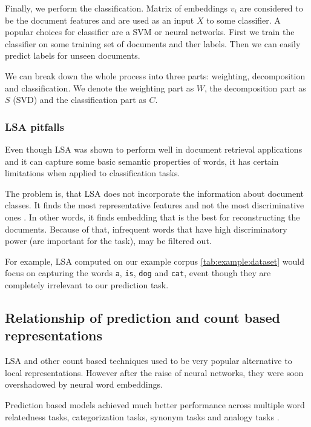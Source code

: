     Finally, we perform the classification.
    Matrix of embeddings $v_i$ are considered to be the document features and are used as an input $X$ to some classifier. 
    A popular choices for classifier are a SVM or neural networks.
    First we train the classifier on some training set of documents and ther labels.
    Then we can easily predict labels for unseen documents.
    
    We can break down the whole process into three parts: weighting, decomposition and classification.
    We denote the weighting part as $W$, the decomposition part as $S$ (SVD) and the classification part as $C$.
    
    \subsubsection{LSA pitfalls}

    Even though LSA was shown to perform well in document retrieval applications and it can capture some basic semantic properties of words,
    it has certain limitations when applied to classification tasks. 
    
    The problem is, that LSA does not incorporate the information about document classes. 
    It finds the most representative features and not the most discriminative ones \cite{berry1995using}.
    In other words, it finds embedding that is the best for reconstructing the documents.
    Because of that, infrequent words that have high discriminatory power (are important for the task), may be filtered out.
    
    For example, LSA computed on our example corpus \ref{tab:example:dataset} would focus on capturing the words \texttt{a}, \texttt{is}, \texttt{dog} and \texttt{cat},
    event though they are completely irrelevant to our prediction task.
    
    \subsection{Relationship of prediction and count based representations} \label{sec:count:vs:predict}
        
    LSA and other count based techniques used to be very popular alternative to local representations.
    However after the raise of neural networks, they were soon overshadowed by neural word embeddings.
    
    Prediction based models achieved much better performance across multiple word relatedness tasks, categorization tasks, synonym tasks and analogy tasks \cite{baroni2014don}. %
    
